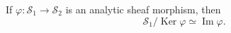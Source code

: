 If $\varphi: \mathcal{S}_1 \rightarrow \mathcal{S}_2$ is an analytic sheaf morphism, then
$$
\mathcal{S}_1 / \operatorname{Ker} \varphi \simeq \operatorname{Im} \varphi.
$$

